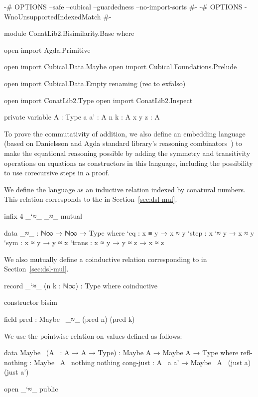 \begin{code}[hide]
{-# OPTIONS --safe --cubical --guardedness --no-import-sorts #-}
{-# OPTIONS -WnoUnsupportedIndexedMatch #-}

module ConatLib2.Bisimilarity.Base where

open import Agda.Primitive

open import Cubical.Data.Maybe
open import Cubical.Foundations.Prelude

open import Cubical.Data.Empty
  renaming (rec to exfalso)

open import ConatLib2.Type
open import ConatLib2.Inspect

private variable
  A : Type
  a a' : A
  n k : A
  x y z : A
\end{code}
To prove the commutativity of addition, we also define an embedding language
(based on Danielsson \cite{danielsson-beating} and Agda standard library's
 reasoning combinators~\cite{agda-stdlib}) to make the equational
reasoning possible by adding the symmetry and transitivity operations on
equations as constructors in this language, including the possibility to use
corecursive steps in a proof.

We define the language as an inductive relation indexed by conatural numbers.
This relation corresponds to the  in
Section~\ref{sec:dsl-mul}.
\begin{code}[hide]
infix 4 _`≈_ _≈_
mutual
\end{code}
\begin{code}
  data _≈_ : ℕ∞ → ℕ∞ → Type where
    `eq     : x ≡ y → x ≈ y
    `step   : x `≈ y → x ≈ y
    `sym    : x ≈ y → y ≈ x
    `trans  : x ≈ y → y ≈ z → x ≈ z
\end{code}
\begin{AgdaMultiCode}%
We also mutually define a coinductive relation corresponding to
 in Section~\ref{sec:dsl-mul}.
\begin{code}
  record _`≈_ (n k : ℕ∞) : Type where
    coinductive
\end{code}
\begin{code}[hide]
    constructor bisim
\end{code}
\begin{code}
    field
      pred : Maybe~ _≈_ (pred n) (pred k)
\end{code}
\end{AgdaMultiCode}
We use the pointwise relation on  values defined as follows:
\begin{code}
  data Maybe~ (A~ : A → A → Type) :
    Maybe A → Maybe A → Type
    where
      refl-nothing : Maybe~ A~ nothing nothing
      cong-just : A~ a a' → Maybe~ A~ (just a) (just a')
\end{code}
\begin{code}[hide]
open _`≈_ public
\end{code}

